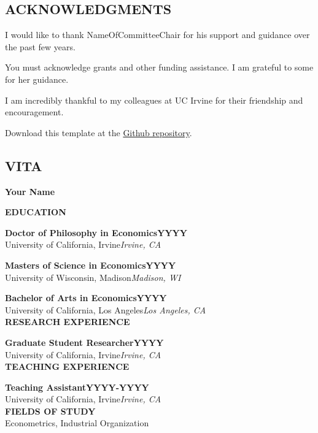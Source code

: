 \documentclass[letterpaper]{report}
\renewcommand*\listfigurename{LIST OF FIGURES}
\renewcommand*\listtablename{LIST OF TABLES}
\begin{document}

\clearpage
\onehalfspacing
\begin{center}
  \section*{ACKNOWLEDGMENTS}
\end{center}

I would like to thank NameOfCommitteeChair for his support and guidance over the past few years. \lipsum[69]

You must acknowledge grants and other funding assistance. I am grateful to some for her guidance. \lipsum[71]

I am incredibly thankful to my colleagues at UC Irvine for their friendship and encouragement. \lipsum[72]

Download this template at the \href{https://github.com/howardhsumail/Dissertation-LaTeX-Template.git}{Github repository}. \lipsum[75]

\clearpage
\onehalfspacing
\begin{center}
  \section*{VITA}
  \textbf{Your Name}
\end{center}
\vspace*{2.25em}
{\parindent0pt
\textbf{EDUCATION}

\textbf{Doctor of Philosophy in Economics\hfill YYYY}\\[-0.1cm]
University of California, Irvine\hfill \textit{Irvine, CA}

\textbf{Masters of Science in Economics\hfill YYYY}\\[-0.1cm]
University of Wisconsin, Madison\hfill \textit{Madison, WI}

\textbf{Bachelor of Arts in Economics\hfill YYYY}\\[-0.1cm]
University of California, Los Angeles\hfill \textit{Los Angeles, CA}\\

\textbf{RESEARCH EXPERIENCE}

\textbf{Graduate Student Researcher\hfill YYYY}\\[-0.1cm]
University of California, Irvine\hfill \textit{Irvine, CA}\\

\textbf{TEACHING EXPERIENCE}

\textbf{Teaching Assistant\hfill YYYY-YYYY}\\[-0.1cm]
University of California, Irvine\hfill \textit{Irvine, CA}\\

\textbf{FIELDS OF STUDY}\\
Econometrics, Industrial Organization}
\end{document}
